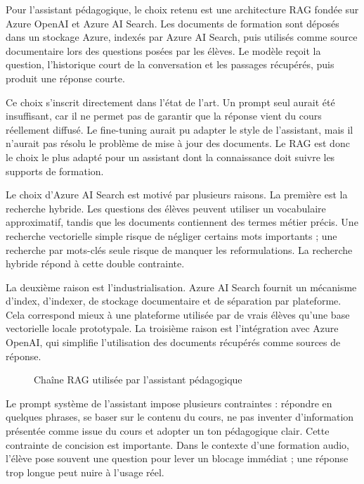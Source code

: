 Pour l'assistant pédagogique, le choix retenu est une architecture RAG fondée sur Azure
OpenAI et Azure AI Search. Les documents de formation sont déposés dans un stockage
Azure, indexés par Azure AI Search, puis utilisés comme source documentaire lors des
questions posées par les élèves. Le modèle reçoit la question, l'historique court de la
conversation et les passages récupérés, puis produit une réponse courte.

Ce choix s'inscrit directement dans l'état de l'art. Un prompt seul aurait été insuffisant,
car il ne permet pas de garantir que la réponse vient du cours réellement diffusé. Le
fine-tuning aurait pu adapter le style de l'assistant, mais il n'aurait pas résolu le problème
de mise à jour des documents. Le RAG est donc le choix le plus adapté pour un assistant
dont la connaissance doit suivre les supports de formation.

Le choix d'Azure AI Search est motivé par plusieurs raisons. La première est la recherche
hybride. Les questions des élèves peuvent utiliser un vocabulaire approximatif, tandis que
les documents contiennent des termes métier précis. Une recherche vectorielle simple
risque de négliger certains mots importants ; une recherche par mots-clés seule risque de
manquer les reformulations. La recherche hybride répond à cette double contrainte.

La deuxième raison est l'industrialisation. Azure AI Search fournit un mécanisme d'index,
d'indexer, de stockage documentaire et de séparation par plateforme. Cela correspond
mieux à une plateforme utilisée par de vrais élèves qu'une base vectorielle locale
prototypale. La troisième raison est l'intégration avec Azure OpenAI, qui simplifie
l'utilisation des documents récupérés comme sources de réponse.

\begin{figure}[h]
\centering
{}
\caption{Chaîne RAG utilisée par l'assistant pédagogique}
\end{figure}

Le prompt système de l'assistant impose plusieurs contraintes : répondre en quelques
phrases, se baser sur le contenu du cours, ne pas inventer d'information présentée comme
issue du cours et adopter un ton pédagogique clair. Cette contrainte de concision est
importante. Dans le contexte d'une formation audio, l'élève pose souvent une question
pour lever un blocage immédiat ; une réponse trop longue peut nuire à l'usage réel.


